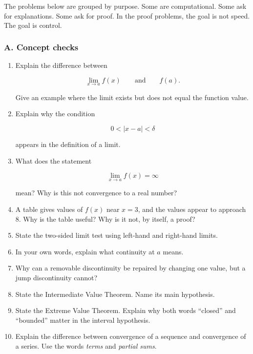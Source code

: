 The problems below are grouped by purpose.  Some are computational.  Some ask for explanations.  Some ask for proof.  In the proof problems, the goal is not speed.  The goal is control.

\subsubsection*{A. Concept checks}

\begin{enumerate}
\item Explain the difference between

\[
\lim_{x\to a}f(x)
\qquad\text{and}\qquad
f(a).
\]

Give an example where the limit exists but does not equal the function value.

\item Explain why the condition

\[
0<|x-a|<\delta
\]

appears in the definition of a limit.

\item What does the statement

\[
\lim_{x\to a}f(x)=\infty
\]

mean?  Why is this not convergence to a real number?

\item A table gives values of \(f(x)\) near \(x=3\), and the values appear to approach \(8\).  Why is the table useful?  Why is it not, by itself, a proof?

\item State the two-sided limit test using left-hand and right-hand limits.

\item In your own words, explain what continuity at \(a\) means.

\item Why can a removable discontinuity be repaired by changing one value, but a jump discontinuity cannot?

\item State the Intermediate Value Theorem.  Name its main hypothesis.

\item State the Extreme Value Theorem.  Explain why both words ``closed'' and ``bounded'' matter in the interval hypothesis.

\item Explain the difference between convergence of a sequence and convergence of a series.  Use the words \emph{terms} and \emph{partial sums}.
\end{enumerate}

